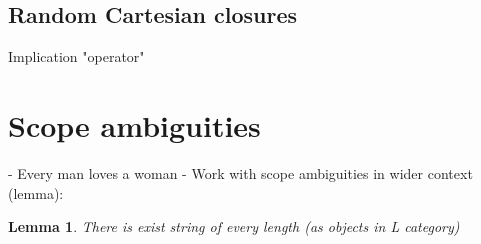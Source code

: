 \documentclass{article}
\newtheorem{lemma}[theorem]{Lemma}
\begin{document}
\subsection{Random Cartesian closures}
Implication "operator"

\section{Scope ambiguities}
- Every man loves a woman  
\newline
- Work with scope ambiguities in wider context (lemma): 
\newline
\begin{lemma}
There is exist string of every length (as objects in L category)
\end{lemma}



\end{document}
